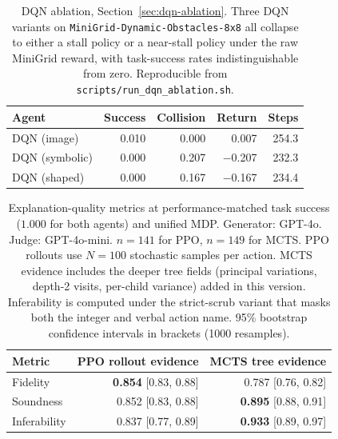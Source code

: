 \documentclass[conference]{IEEEtran}
\begin{document}
\begin{table}[t]
\centering
\caption{DQN ablation, Section~\ref{sec:dqn-ablation}. Three DQN
variants on \texttt{MiniGrid-Dynamic-Obstacles-8x8} all collapse to
either a stall policy or a near-stall policy under the raw MiniGrid
reward, with task-success rates indistinguishable from zero.
Reproducible from \texttt{scripts/run\_dqn\_ablation.sh}.}
\label{tab:dqnablation}
\begin{tabular}{lrrrr}
\toprule
Agent & Success & Collision & Return & Steps \\
\midrule
DQN (image)       & 0.010 & 0.000 &    0.007 & 254.3 \\
DQN (symbolic)    & 0.000 & 0.207 & $-$0.207 & 232.3 \\
DQN (shaped)      & 0.000 & 0.167 & $-$0.167 & 234.4 \\
\bottomrule
\end{tabular}
\end{table}

\begin{table}[t]
\centering
\caption{Explanation-quality metrics at performance-matched task
success ($1.000$ for both agents) and unified MDP. Generator:
GPT-4o. Judge: GPT-4o-mini. $n = 141$ for PPO, $n = 149$ for MCTS.
PPO rollouts use $N = 100$ stochastic samples per action. MCTS
evidence includes the deeper tree fields (principal variations,
depth-2 visits, per-child variance) added in this version.
Inferability is computed under the strict-scrub variant that masks
both the integer and verbal action name. 95\% bootstrap confidence
intervals in brackets (1000 resamples).}
\label{tab:metrics}
\begin{tabular}{lrr}
\toprule
Metric & PPO rollout evidence & MCTS tree evidence \\
\midrule
Fidelity       & \textbf{0.854} [0.83, 0.88] & 0.787 [0.76, 0.82]          \\
Soundness      & 0.852 [0.83, 0.88]          & \textbf{0.895} [0.88, 0.91] \\
Inferability   & 0.837 [0.77, 0.89]          & \textbf{0.933} [0.89, 0.97] \\
\bottomrule
\end{tabular}
\end{table}
\end{document}
